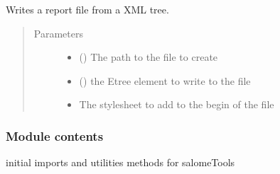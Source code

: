 \documentclass[a4paper,10pt,english]{sphinxmanual}
\begin{document}
\begin{fulllineitems}
\label{\detokenize{commands/apidoc/src:src.xmlManager.write_report}}
Writes a report file from a XML tree.
\begin{quote}\begin{description}
\item[{Parameters}] \leavevmode\begin{itemize}
\item {} 
 () \textendash{} The path to the file to create

\item {} 
 () \textendash{} the Etree element to write to the file

\item {} 
 \textendash{} The stylesheet to add to the begin of the file

\end{itemize}

\end{description}\end{quote}

\end{fulllineitems}



\subsubsection{Module contents}
\label{\detokenize{commands/apidoc/src:module-src}}\label{\detokenize{commands/apidoc/src:module-contents}}
initial imports and utilities methods for salomeTools
\end{document}
